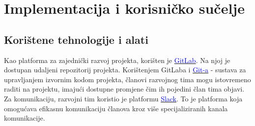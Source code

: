 \chapter{Implementacija i korisničko sučelje} \label{implementacija}
		
		
		\section{Korištene tehnologije i alati}
		
			 
			
        \par{
            Kao platforma za zajednički razvoj projekta, korišten je \href{https://gitlab.com/}{\textcolor{blue}{GitLab}}. Na njoj je dostupan udaljeni repozitorij projekta. Korištenjem GitLaba i \href{https://git-scm.com/}{\textcolor{blue}{Git-a}} - sustava za upravljanjem izvornim kodom projekta, članovi razvojnog tima mogu istovremeno raditi na projektu, imajući dostupne promjene čim ih pojedini član tima objavi. Za komunikaciju, razvojni tim koristio je platformu \href{https://slack.com/}{\textcolor{blue}{Slack}}. To je platforma koja omogućava efikasnu komunikaciju članova kroz više specijaliziranih kanala komunikacije.
        }		
        
